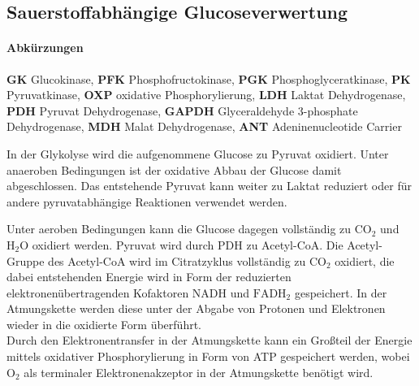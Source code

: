 \subsection{Sauerstoffabhängige Glucoseverwertung} 
\paragraph{Abkürzungen}
\small
\textbf{GK} Glucokinase,
  \textbf{PFK} Phosphofructokinase,
  \textbf{PGK} Phosphoglyceratkinase,
  \textbf{PK} Pyruvatkinase,
  \textbf{OXP} oxidative Phosphorylierung,
  \textbf{LDH} Laktat Dehydrogenase,
  \textbf{PDH} Pyruvat Dehydrogenase,
  \textbf{GAPDH} Glyceraldehyde 3-phosphate Dehydrogenase,
  \textbf{MDH} Malat Dehydrogenase,
  \textbf{ANT} Adeninenucleotide Carrier
  \normalsize

In der Glykolyse wird die aufgenommene Glucose zu Pyruvat oxidiert. Unter anaeroben Bedingungen ist der oxidative Abbau der Glucose damit abgeschlossen. Das entstehende Pyruvat kann weiter zu Laktat reduziert oder für andere pyruvatabhängige Reaktionen verwendet werden.

Unter aeroben Bedingungen kann die Glucose dagegen vollständig zu $\text{CO}_2$ und $\text{H}_2\text{O}$ oxidiert werden. Pyruvat wird durch PDH zu Acetyl-CoA. Die Acetyl-Gruppe des Acetyl-CoA wird im Citratzyklus vollständig zu $\text{CO}_2$ oxidiert, die dabei entstehenden Energie wird in Form der reduzierten elektronenübertragenden Kofaktoren NADH und $\text{FADH}_2$ gespeichert. In der Atmungskette werden diese unter der Abgabe von Protonen und Elektronen wieder in die oxidierte Form überführt.\\
Durch den Elektronentransfer in der Atmungskette kann ein Großteil der Energie mittels oxidativer Phosphorylierung in Form von ATP gespeichert werden, wobei $\text{O}_2$ als terminaler Elektronenakzeptor in der Atmungskette benötigt wird. 

